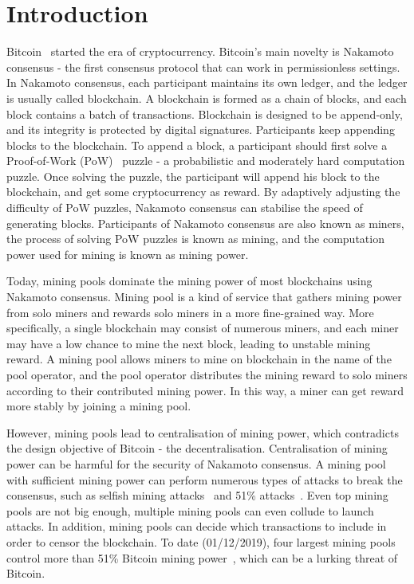 \section{Introduction}
\label{sec:intro}

Bitcoin~\cite{nakamoto2008bitcoin} started the era of cryptocurrency.
Bitcoin's main novelty is Nakamoto consensus - the first consensus protocol that can work in permissionless settings.
In Nakamoto consensus, each participant maintains its own ledger, and the ledger is usually called blockchain.
A blockchain is formed as a chain of blocks, and each block contains a batch of transactions.
Blockchain is designed to be append-only, and its integrity is protected by digital signatures.
Participants keep appending blocks to the blockchain.
To append a block, a participant should first solve a Proof-of-Work (PoW)~\cite{dwork1992pricing} puzzle - a probabilistic and moderately hard computation puzzle.
Once solving the puzzle, the participant will append his block to the blockchain, and get some cryptocurrency as reward.
By adaptively adjusting the difficulty of PoW puzzles, Nakamoto consensus can stabilise the speed of generating blocks.
Participants of Nakamoto consensus are also known as miners, the process of solving PoW puzzles is known as mining, and the computation power used for mining is known as mining power.

Today, mining pools dominate the mining power of most blockchains using Nakamoto consensus.
Mining pool is a kind of service that gathers mining power from solo miners and rewards solo miners in a more fine-grained way.
More specifically, a single blockchain may consist of numerous miners, and each miner may have a low chance to mine the next block, leading to unstable mining reward.
A mining pool allows miners to mine on blockchain in the name of the pool operator, and the pool operator distributes the mining reward to solo miners according to their contributed mining power.
In this way, a miner can get reward more stably by joining a mining pool.

However, mining pools lead to centralisation of mining power, which contradicts the design objective of Bitcoin - the decentralisation.
Centralisation of mining power can be harmful for the security of Nakamoto consensus.
A mining pool with sufficient mining power can perform numerous types of attacks to break the consensus, such as selfish mining attacks~\cite{eyal2018majority} and 51\% attacks~\cite{nakamoto2008bitcoin}.
Even top mining pools are not big enough, multiple mining pools can even collude to launch attacks.
In addition, mining pools can decide which transactions to include in order to censor the blockchain.
To date (01/12/2019), four largest mining pools control more than 51\% Bitcoin mining power~\cite{btc-com}, which can be a lurking threat of Bitcoin.




